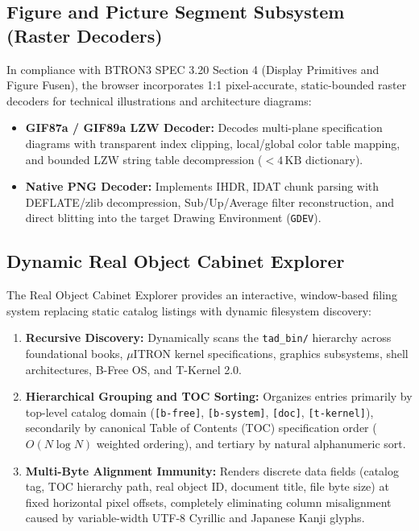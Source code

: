\documentclass[10pt,journal,compsoc,twocolumn]{article}
\begin{document}
\subsection{Figure and Picture Segment Subsystem (Raster Decoders)}
In compliance with BTRON3 SPEC 3.20 Section 4 (Display Primitives and Figure Fusen), the browser incorporates 1:1 pixel-accurate, static-bounded raster decoders for technical illustrations and architecture diagrams:
\begin{itemize}[leftmargin=*]
    \item \textbf{GIF87a / GIF89a LZW Decoder:} Decodes multi-plane specification diagrams with transparent index clipping, local/global color table mapping, and bounded LZW string table decompression ($< 4\,\text{KB}$ dictionary).
    \item \textbf{Native PNG Decoder:} Implements IHDR, IDAT chunk parsing with DEFLATE/zlib decompression, Sub/Up/Average filter reconstruction, and direct blitting into the target Drawing Environment (\texttt{GDEV}).
\end{itemize}

\subsection{Dynamic Real Object Cabinet Explorer}
The Real Object Cabinet Explorer provides an interactive, window-based filing system replacing static catalog listings with dynamic filesystem discovery:
\begin{enumerate}[leftmargin=*]
    \item \textbf{Recursive Discovery:} Dynamically scans the \texttt{tad\_bin/} hierarchy across foundational books, $\mu$ITRON kernel specifications, graphics subsystems, shell architectures, B-Free OS, and T-Kernel 2.0.
    \item \textbf{Hierarchical Grouping and TOC Sorting:} Organizes entries primarily by top-level catalog domain (\texttt{[b-free]}, \texttt{[b-system]}, \texttt{[doc]}, \texttt{[t-kernel]}), secondarily by canonical Table of Contents (TOC) specification order ($O(N \log N)$ weighted ordering), and tertiary by natural alphanumeric sort.
    \item \textbf{Multi-Byte Alignment Immunity:} Renders discrete data fields (catalog tag, TOC hierarchy path, real object ID, document title, file byte size) at fixed horizontal pixel offsets, completely eliminating column misalignment caused by variable-width UTF-8 Cyrillic and Japanese Kanji glyphs.
\end{enumerate}
\end{document}
